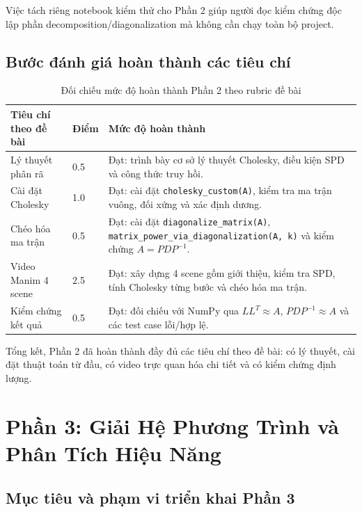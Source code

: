 \documentclass[a4paper]{article}
\begin{document}
Việc tách riêng notebook kiểm thử cho Phần 2 giúp người đọc kiểm chứng độc lập phần decomposition/diagonalization mà không cần chạy toàn bộ project.

\subsection{Bước đánh giá hoàn thành các tiêu chí}

\begin{table}[H]
    \centering
    \begin{tabular}{|p{}|p{}|p{}|}
    \hline
    \textbf{Tiêu chí theo đề bài} & \textbf{Điểm} & \textbf{Mức độ hoàn thành} \\
    \hline
    Lý thuyết phân rã & 0.5 & Đạt: trình bày cơ sở lý thuyết Cholesky, điều kiện SPD và công thức truy hồi. \\
    \hline
    Cài đặt Cholesky & 1.0 & Đạt: cài đặt \texttt{cholesky\_custom(A)}, kiểm tra ma trận vuông, đối xứng và xác định dương. \\
    \hline
    Chéo hóa ma trận & 0.5 & Đạt: cài đặt \texttt{diagonalize\_matrix(A)}, \texttt{matrix\_power\_via\_diagonalization(A, k)} và kiểm chứng $A = PDP^{-1}$. \\
    \hline
    Video Manim 4 scene & 2.5 & Đạt: xây dựng 4 scene gồm giới thiệu, kiểm tra SPD, tính Cholesky từng bước và chéo hóa ma trận. \\
    \hline
    Kiểm chứng kết quả & 0.5 & Đạt: đối chiếu với NumPy qua $LL^T \approx A$, $PDP^{-1} \approx A$ và các test case lỗi/hợp lệ. \\
    \hline
    \end{tabular}
        \caption{Đối chiếu mức độ hoàn thành Phần 2 theo rubric đề bài}
    \label{tab:part2_rubric}
\end{table}
Tổng kết, Phần 2 đã hoàn thành đầy đủ các tiêu chí theo đề bài: có lý thuyết, cài đặt thuật toán từ đầu, có video trực quan hóa chi tiết và có kiểm chứng định lượng.

\section {Phần 3: Giải Hệ Phương Trình và Phân Tích Hiệu Năng}

\subsection{Mục tiêu và phạm vi triển khai Phần 3}
\end{document}
